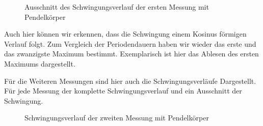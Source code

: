 \documentclass[twoside]{protokoll}
\begin{document}
\begin{figure}[H]
    \centering
    \hfill
    \caption{Ausschnitt des Schwingungsverlauf der ersten Messung mit Pendelkörper}
    \end{figure}

Auch hier können wir erkennen, dass die Schwingung einem Kosinus förmigen Verlauf folgt.
Zum Vergleich der Periodendauern haben wir wieder das erste und das zwanzigste Maximum bestimmt.
Exemplarisch ist hier das Ablesen des ersten Maximums dargestellt.

Für die Weiteren Messungen sind hier auch die Schwingungsverläufe Dargestellt.
Für jede Messung der komplette Schwingungsverlauf und ein Ausschnitt der Schwingung. 

\begin{figure}[H]
    \centering
    \hfill
    \caption{Schwingungsverlauf der zweiten Messung mit Pendelkörper}
    \end{figure}
 
\end{document}
